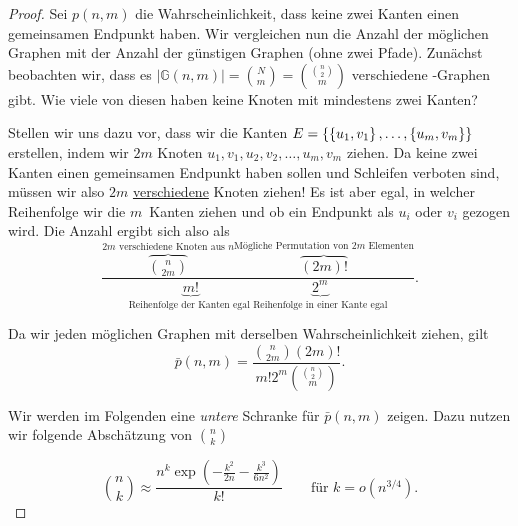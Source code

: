 \begin{proof}
    Sei $p(n,m)$ die Wahrscheinlichkeit, dass keine zwei Kanten einen gemeinsamen Endpunkt haben.
    Wir vergleichen nun die Anzahl der möglichen Graphen mit der Anzahl der günstigen Graphen (\dh ohne zwei Pfade).
    Zunächst beobachten wir, dass es $|\mathbb G(n,m)| = \binom N m = \binom{\binom n 2}{m}$ verschiedene \Gnm-Graphen gibt.
    Wie viele von diesen haben keine Knoten mit mindestens zwei Kanten?

    Stellen wir uns dazu vor, dass wir die Kanten $E = \left\{\left\{u_1, v_1\right\}, \ldots, \left\{u_m, v_m\right\}\right\}$ erstellen, indem wir $2m$ Knoten $u_1, v_1, u_2, v_2, \ldots, u_m, v_m$ ziehen.
    Da keine zwei Kanten einen gemeinsamen Endpunkt haben sollen und Schleifen verboten sind, müssen wir also $2m$ \underline{verschiedene} Knoten ziehen!
    Es ist aber egal, in welcher Reihenfolge wir die $m$~Kanten ziehen und ob ein Endpunkt als $u_i$ oder $v_i$ gezogen wird.
    Die Anzahl ergibt sich also als
    \begin{equation}
        \frac{
            \overbrace{\binom{n}{2m}}^\text{$2m$ verschiedene Knoten aus $n$}
            \overbrace{(2m)!}^\text{Mögliche Permutation von $2m$ Elementen}
        }{
            \underbrace{m!}_\text{Reihenfolge der Kanten egal\ \ \ }
            \underbrace{2^m}_\text{Reihenfolge in einer Kante egal}
        }.
    \end{equation}

    \noindent
    Da wir jeden möglichen Graphen mit derselben Wahrscheinlichkeit ziehen, gilt
    \begin{equation}
        \bar p(n, m) = \frac{\binom{n}{2m} (2m)!}{m! 2^m \binom{\binom n 2}{m}}. \label{eq:wkeit_keine_zwei_kanten}
    \end{equation}

    \noindent
    Wir werden im Folgenden eine \emph{untere} Schranke für $\bar p(n,m)$ zeigen.
    Dazu nutzen wir folgende Abschätzung von $\binom n k$

    \begin{equation}
        \binom n k \approx \frac{n^k \exp\left(-\frac{k^2}{2n} - \frac{k^3}{6n^2}\right)}{k!}
        \quad\quad \text{für } k = o(n^{3/4}).
    \end{equation}


\end{proof}
